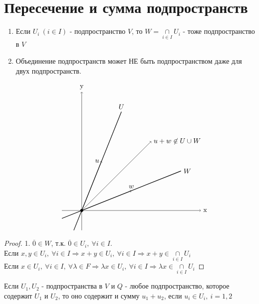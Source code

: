 \section{Пересечение и сумма подпространств}
  \begin{subtheorem}\tab
    \begin{enumerate}
      \item Если $U_i \ (i\in I)$ - подпространство $V$, то $W = \underset{i\in I}{\cap}U_i$ - тоже подпространство в $V$
      \item Объединение подпространств может НЕ быть подпространством даже для двух подпространств.
      
      \[
        \begin{tikzpicture}
          \draw[->] (-1, 0) -- (6, 0) node[right] {x};
          \draw[->] (0, -1) -- (0, 6) node[above] {y};
          \draw[fill] (0, 0) circle (2pt);        
          \draw[thick] (-0.4, -1) -- (2, 5) node[above] {$U$};
          \draw[thick] (-1, -0.4) -- (5, 2) node[right] {$W$};
          \draw[->] (0, 0) -- (1, 2.5) node[left] {$u$};
          \draw[->] (0, 0) -- (2.5, 1) node[above] {$w$};
          \draw[->] (0, 0) -- (3.5, 3.5) node[right] {$u+w\not\in U\cup W$};
      \end{tikzpicture}
      \]

    \end{enumerate}
  \end{subtheorem} 
  \begin{proof}
    1. $\overline{0} \in W$, т.к. $\overline{0} \in U_i, \ \forall i\in I$. \vspace{0.2cm}\\
    Если $x,y \in U_i, \ \forall i\in I \Longrightarrow x+y \in U_i, \ \forall i\in I \Longrightarrow x+y \in \underset{i\in I}{\cap}U_i$ \vspace{0.15cm}\\
    Если $x \in U_i, \ \forall i\in I, \ \forall \lambda \in F \Longrightarrow \lambda x \in U_i, \ \forall i\in I \Longrightarrow \lambda x \in \underset{i\in I}{\cap}U_i$  
  \end{proof}
  \begin{remark}
    Если $U_1, U_2$ - подпространства в $V$ и $Q$ - любое подпространство, которое содержит $U_1$ и $U_2$, то оно содержит и сумму $u_1+u_2$, если $u_i \in U_i, \ i =1,2$       
  \end{remark}
